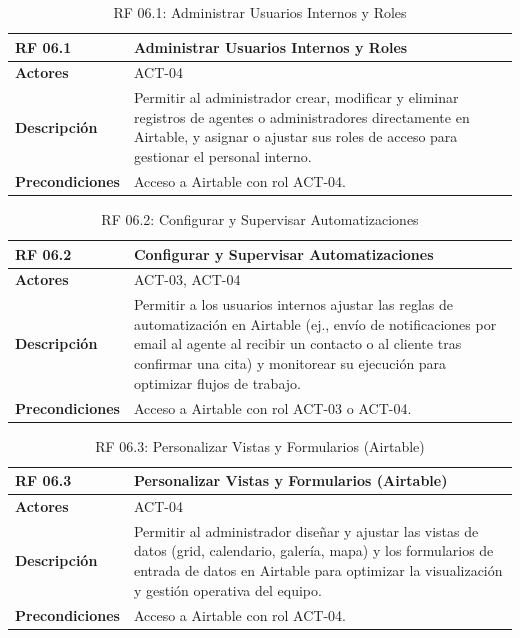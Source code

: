 \begin{table}[H]
\centering
\begin{tabular}{|p{3cm}|p{10cm}|}
\hline
\rowcolor{tealblue}
\textbf{RF 06.1} & \textbf{Administrar Usuarios Internos y Roles} \\
\hline
\textbf{Actores} & ACT-04 \\
\hline
\textbf{Descripción} & Permitir al administrador crear, modificar y eliminar registros de agentes o administradores directamente en Airtable, y asignar o ajustar sus roles de acceso para gestionar el personal interno. \\
\hline
\textbf{Precondiciones} & Acceso a Airtable con rol ACT-04. \\
\hline
\end{tabular}
\caption{RF 06.1: Administrar Usuarios Internos y Roles}
\label{tab:rf_airtable_6_1}
\end{table}

\begin{table}[H]
\centering
\begin{tabular}{|p{3cm}|p{10cm}|}
\hline
\rowcolor{tealblue}
\textbf{RF 06.2} & \textbf{Configurar y Supervisar Automatizaciones} \\
\hline
\textbf{Actores} & ACT-03, ACT-04 \\
\hline
\textbf{Descripción} & Permitir a los usuarios internos ajustar las reglas de automatización en Airtable (ej., envío de notificaciones por email al agente al recibir un contacto o al cliente tras confirmar una cita) y monitorear su ejecución para optimizar flujos de trabajo. \\
\hline
\textbf{Precondiciones} & Acceso a Airtable con rol ACT-03 o ACT-04. \\
\hline
\end{tabular}
\caption{RF 06.2: Configurar y Supervisar Automatizaciones}
\label{tab:rf_airtable_6_2}
\end{table}

\begin{table}[H]
\centering
\begin{tabular}{|p{3cm}|p{10cm}|}
\hline
\rowcolor{tealblue}
\textbf{RF 06.3} & \textbf{Personalizar Vistas y Formularios (Airtable)} \\
\hline
\textbf{Actores} & ACT-04 \\
\hline
\textbf{Descripción} & Permitir al administrador diseñar y ajustar las vistas de datos (grid, calendario, galería, mapa) y los formularios de entrada de datos en Airtable para optimizar la visualización y gestión operativa del equipo. \\
\hline
\textbf{Precondiciones} & Acceso a Airtable con rol ACT-04. \\
\hline
\end{tabular}
\caption{RF 06.3: Personalizar Vistas y Formularios (Airtable)}
\label{tab:rf_airtable_6_3}
\end{table}


